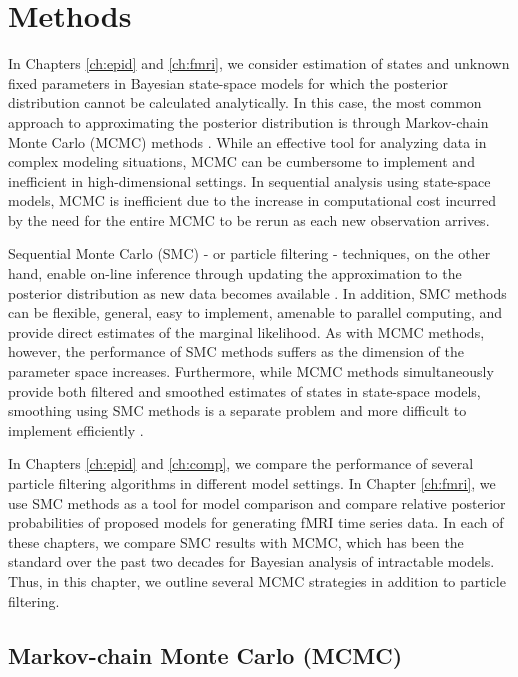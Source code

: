 \chapter{Methods \label{ch:meth}}

In Chapters \ref{ch:epid} and \ref{ch:fmri}, we consider estimation of states and unknown fixed parameters in Bayesian state-space models for which the posterior distribution cannot be calculated analytically. In this case, the most common approach to approximating the posterior distribution is through Markov-chain Monte Carlo (MCMC) methods \citep{Gelf:Smit:samp:1990}. While an effective tool for analyzing data in complex modeling situations, MCMC can be cumbersome to implement and inefficient in high-dimensional settings. In sequential analysis using state-space models, MCMC is inefficient due to the increase in computational cost incurred by the need for the entire MCMC to be rerun as each new observation arrives.

Sequential Monte Carlo (SMC) - or particle filtering - techniques, on the other hand, enable on-line inference through updating the approximation to the posterior distribution as new data becomes available \citep{Douc:deFr:Gord:sequ:2001, cappe2007overview}. In addition, SMC methods can be flexible, general, easy to implement, amenable to parallel computing, and provide direct estimates of the marginal likelihood. As with MCMC methods, however, the performance of SMC methods suffers as the dimension of the parameter space increases. Furthermore, while MCMC methods simultaneously provide both filtered and smoothed estimates of states in state-space models, smoothing using SMC methods is a separate problem and more difficult to implement efficiently \cite[Sec 5][]{douc:joh:tut:2009}.

In Chapters \ref{ch:epid} and \ref{ch:comp}, we compare the performance of several particle filtering algorithms in different model settings. In Chapter \ref{ch:fmri}, we use SMC methods as a tool for model comparison and compare relative posterior probabilities of proposed models for generating fMRI time series data. In each of these chapters, we compare SMC results with MCMC, which has been the standard over the past two decades for Bayesian analysis of intractable models. Thus, in this chapter, we outline several MCMC strategies in addition to particle filtering.

\section{Markov-chain Monte Carlo (MCMC) \label{sec:mcmc}}

